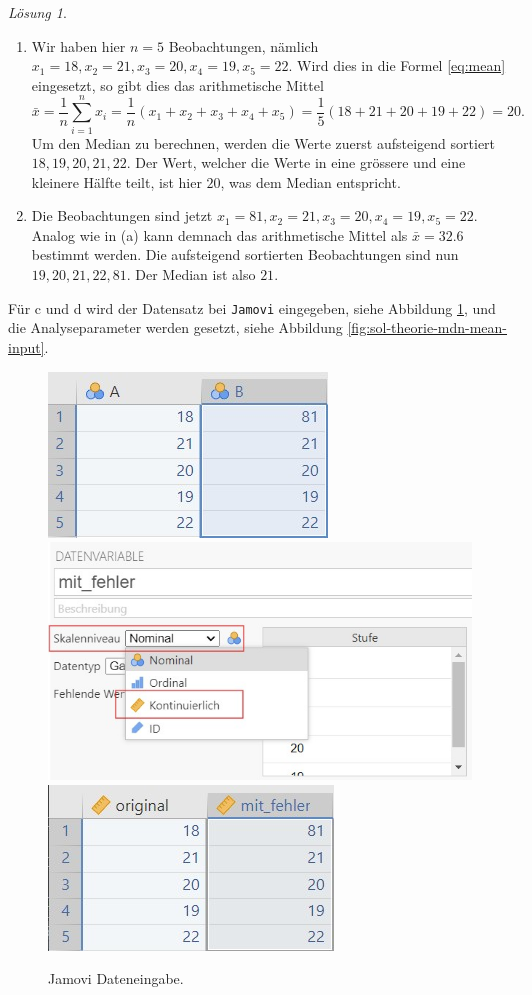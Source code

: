 \documentclass[
]{book}
\providecommand{\tightlist}{%
  \setlength{\itemsep}{0pt}\setlength{\parskip}{0pt}}
\theoremstyle{definition}
\theoremstyle{definition}
\theoremstyle{definition}
\theoremstyle{definition}
\theoremstyle{remark}
\newtheorem*{solution}{Lösung}
\begin{document}
\begin{solution}
\leavevmode

\begin{enumerate}
\def\labelenumi{(\alph{enumi})}
\tightlist
\item
  Wir haben hier \(n=5\) Beobachtungen, nämlich \(x_1 = 18, x_2 = 21, x_3 = 20, x_4 = 19, x_5=22\). Wird dies in die Formel \eqref{eq:mean} eingesetzt, so gibt dies das arithmetische Mittel
  \[\bar{x} = \frac{1}{n}\sum^n_{i=1} x_i = \frac{1}{n}(x_1 + x_2 + x_3 + x_4 + x_5) =  \frac{1}{5}(18+ 21+ 20+ 19+ 22) = 20.\]
  Um den Median zu berechnen, werden die Werte zuerst aufsteigend sortiert \(18, 19, 20, 21, 22\). Der Wert, welcher die Werte in eine grössere und eine kleinere Hälfte teilt, ist hier \(20\), was dem Median entspricht.
\item
  Die Beobachtungen sind jetzt \(x_1 = 81, x_2 = 21, x_3 = 20, x_4 = 19, x_5=22\). Analog wie in (a) kann demnach das arithmetische Mittel als \(\bar{x} = 32.6\) bestimmt werden. Die aufsteigend sortierten Beobachtungen sind nun \(19, 20, 21, 22, 81\). Der Median ist also \(21\).
\end{enumerate}

Für c und d wird der Datensatz bei \texttt{Jamovi} eingegeben, siehe Abbildung \ref{fig:sol-theorie-mdn-mean-data}, und die Analyseparameter werden gesetzt, siehe Abbildung \ref{fig:sol-theorie-mdn-mean-input}.

\begin{figure}
\includegraphics[width=0.33\linewidth]{figures/02-exr-theorie-mdn-mean-data-input} \includegraphics[width=0.33\linewidth]{figures/02-exr-theorie-mdn-mean-data-mod} \includegraphics[width=0.33\linewidth]{figures/02-exr-theorie-mdn-mean-data-clean} \caption{Jamovi Dateneingabe.}\label{fig:sol-theorie-mdn-mean-data}
\end{figure}


\end{solution}
\end{document}
